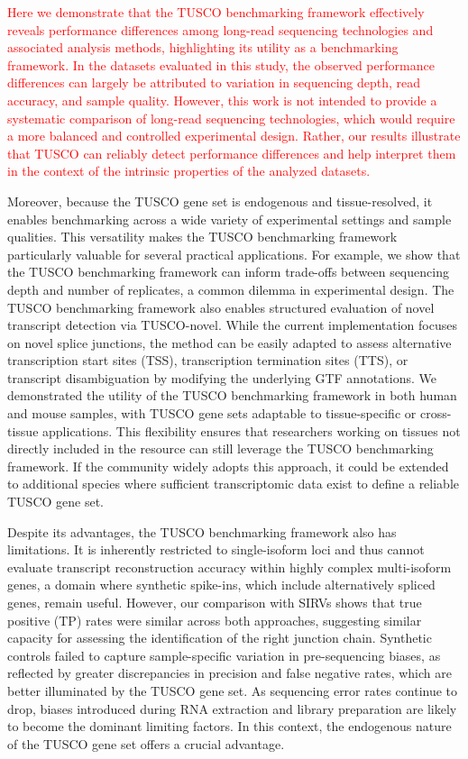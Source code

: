\documentclass[pdflatex,sn-nature]{sn-jnl}%
\newcommand{\tuscoGeneSet}{TUSCO gene set}
\newcommand{\tuscoBenchmarkingFramework}{TUSCO benchmarking framework}
\newcommand{\tuscoNovel}{TUSCO-novel}
\begin{document}
\textcolor{red}{Here we demonstrate that the \tuscoBenchmarkingFramework{} effectively reveals performance differences among long-read sequencing technologies and associated analysis methods, highlighting its utility as a benchmarking framework. In the datasets evaluated in this study, the observed performance differences can largely be attributed to variation in sequencing depth, read accuracy, and sample quality. However, this work is not intended to provide a systematic comparison of long-read sequencing technologies, which would require a more balanced and controlled experimental design. Rather, our results illustrate that TUSCO can reliably detect performance differences and help interpret them in the context of the intrinsic properties of the analyzed datasets.}

Moreover, because the \tuscoGeneSet{} is endogenous and tissue-resolved, it enables benchmarking across a wide variety of experimental settings and sample qualities. This versatility makes the \tuscoBenchmarkingFramework{} particularly valuable for several practical applications. For example, we show that the \tuscoBenchmarkingFramework{} can inform trade-offs between sequencing depth and number of replicates, a common dilemma in experimental design. The \tuscoBenchmarkingFramework{} also enables structured evaluation of novel transcript detection via \tuscoNovel{}. While the current implementation focuses on novel splice junctions, the method can be easily adapted to assess alternative transcription start sites (TSS), transcription termination sites (TTS), or transcript disambiguation by modifying the underlying GTF annotations. We demonstrated the utility of the \tuscoBenchmarkingFramework{} in both human and mouse samples, with \tuscoGeneSet{}s adaptable to tissue-specific or cross-tissue applications. This flexibility ensures that researchers working on tissues not directly included in the resource can still leverage the \tuscoBenchmarkingFramework{}. If the community widely adopts this approach, it could be extended to additional species where sufficient transcriptomic data exist to define a reliable \tuscoGeneSet{}.

Despite its advantages, the \tuscoBenchmarkingFramework{} also has limitations. It is inherently restricted to single-isoform loci and thus cannot evaluate transcript reconstruction accuracy within highly complex multi-isoform genes, a domain where synthetic spike-ins, which include alternatively spliced genes, remain useful. However, our comparison with SIRVs shows that true positive (TP) rates were similar across both approaches, suggesting similar capacity for assessing the identification of the right junction chain. Synthetic controls failed to capture sample-specific variation in pre-sequencing biases, as reflected by greater discrepancies in precision and false negative rates, which are better illuminated by the \tuscoGeneSet{}. As sequencing error rates continue to drop, biases introduced during RNA extraction and library preparation are likely to become the dominant limiting factors. In this context, the endogenous nature of the \tuscoGeneSet{} offers a crucial advantage.
\end{document}
